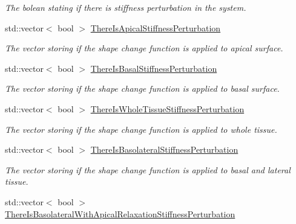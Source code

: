 \begin{DoxyCompactItemize}
\begin{DoxyCompactList}\small\item\em The bolean stating if there is stiffness perturbation in the system. \end{DoxyCompactList}\item 
\hypertarget{classSimulation_ab0d9567de53b463e14b28ae81b35c279}{}std\+::vector$<$ bool $>$ \hyperlink{classSimulation_ab0d9567de53b463e14b28ae81b35c279}{There\+Is\+Apical\+Stiffness\+Perturbation}\label{classSimulation_ab0d9567de53b463e14b28ae81b35c279}

\begin{DoxyCompactList}\small\item\em The vector storing if the shape change function is applied to apical surface. \end{DoxyCompactList}\item 
\hypertarget{classSimulation_a159554afc90804c2b60a4ac74bc8d0c1}{}std\+::vector$<$ bool $>$ \hyperlink{classSimulation_a159554afc90804c2b60a4ac74bc8d0c1}{There\+Is\+Basal\+Stiffness\+Perturbation}\label{classSimulation_a159554afc90804c2b60a4ac74bc8d0c1}

\begin{DoxyCompactList}\small\item\em The vector storing if the shape change function is applied to basal surface. \end{DoxyCompactList}\item 
\hypertarget{classSimulation_a62aea550cbc8c8e7a767e44512a54668}{}std\+::vector$<$ bool $>$ \hyperlink{classSimulation_a62aea550cbc8c8e7a767e44512a54668}{There\+Is\+Whole\+Tissue\+Stiffness\+Perturbation}\label{classSimulation_a62aea550cbc8c8e7a767e44512a54668}

\begin{DoxyCompactList}\small\item\em The vector storing if the shape change function is applied to whole tissue. \end{DoxyCompactList}\item 
\hypertarget{classSimulation_a673dec3e38b4fbf4b22de30069ba32dd}{}std\+::vector$<$ bool $>$ \hyperlink{classSimulation_a673dec3e38b4fbf4b22de30069ba32dd}{There\+Is\+Basolateral\+Stiffness\+Perturbation}\label{classSimulation_a673dec3e38b4fbf4b22de30069ba32dd}

\begin{DoxyCompactList}\small\item\em The vector storing if the shape change function is applied to basal and lateral tissue. \end{DoxyCompactList}\item 
\hypertarget{classSimulation_a5ec07dc74b012952665fa54ed35a2736}{}std\+::vector$<$ bool $>$ \hyperlink{classSimulation_a5ec07dc74b012952665fa54ed35a2736}{There\+Is\+Basolateral\+With\+Apical\+Relaxation\+Stiffness\+Perturbation}\label{classSimulation_a5ec07dc74b012952665fa54ed35a2736}


\end{DoxyCompactItemize}
